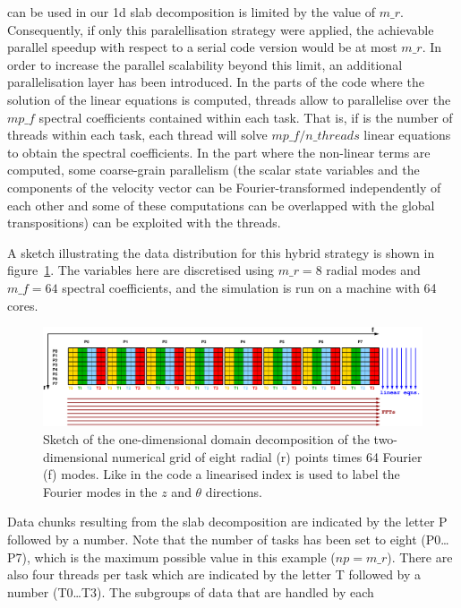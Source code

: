 \documentclass[a4paper, 11pt, DIV=11]{scrartcl}
\begin{document}
can be used in our 1d slab decomposition is limited by the value of $m\_r$. Consequently,
if only this paralellisation strategy were applied, the achievable parallel speedup with
respect to a serial code version would be at most $m\_r$. In order to increase the parallel
scalability beyond this limit, an additional \omp parallelisation layer has been introduced.
In the parts of the code where the solution of the linear equations is computed, \omp
threads allow to parallelise over the $mp\_f$ spectral coefficients contained within each
\mpi task. That is, if  is the number of \omp threads within each \mpi
task, each thread will solve $mp\_f/n\_threads$ linear equations to obtain the spectral
coefficients. In the part where the non-linear terms are computed, some coarse-grain
parallelism (\eg the scalar state variables and the components of the velocity vector can
be Fourier-transformed independently of each other and some of these computations can be
overlapped with the global transpositions) can be exploited with the \omp threads.
\par
A sketch illustrating the data distribution for this hybrid strategy is shown in
figure~\ref{fig:domdec}. The variables here are discretised using $m\_r=8$ radial
modes and $m\_f=64$ spectral coefficients, and the simulation is run on a machine
with 64 cores.
\begin{figure}[htb]
\includegraphics[width=1.00\linewidth]{figures/hybrid_par.pdf}
\caption{Sketch of the one-dimensional domain decomposition of the
two-dimensional numerical grid of eight radial (r) points times 64 Fourier
(f) modes. Like in the code a linearised index is used to label the
Fourier modes in the $z$ and $\theta$ directions.}
\label{fig:domdec}
\end{figure}
Data chunks resulting from the \mpi slab decomposition are indicated by the
letter  P followed by a number. Note that the number of \mpi tasks has been set to
eight (P0\dots P7), which is the maximum possible value in this example ($np=m\_r$).
There are also four \omp threads per \mpi task which are indicated by the letter T
followed by a number (T0\dots T3). The subgroups of data that are handled by each
\end{document}
